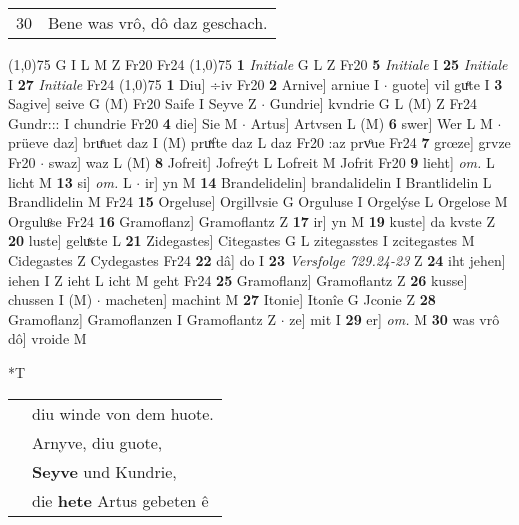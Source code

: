\documentclass[8pt,a4paper,notitlepage]{article}
\begin{document}
\begin{table}[ht]
\begin{minipage}[t]{0.5\linewidth}
\begin{tabular}{rl}
30 & Bene was vrô, dô daz geschach.\\ 
\end{tabular}
\scriptsize
\line(1,0){75} \newline
G I L M Z Fr20 Fr24 \newline
\line(1,0){75} \newline
\textbf{1} \textit{Initiale} G L Z Fr20  \textbf{5} \textit{Initiale} I  \textbf{25} \textit{Initiale} I  \textbf{27} \textit{Initiale} Fr24  \newline
\line(1,0){75} \newline
\textbf{1} Diu] ÷iv Fr20 \textbf{2} Arnive] arniue I  $\cdot$ guote] vil guͤte I \textbf{3} Sagive] seive G (M) Fr20 Saife I Seyve Z  $\cdot$ Gundrie] kvndrie G L (M) Z Fr24 Gundr::: I chundrie Fr20 \textbf{4} die] Sie M  $\cdot$ Artus] Artvsen L (M) \textbf{6} swer] Wer L M  $\cdot$ prüeve daz] bruͤuet daz I (M) pruͯfte daz L daz Fr20 :az prvͦue Fr24 \textbf{7} grœze] grvze Fr20  $\cdot$ swaz] waz L (M) \textbf{8} Jofreit] Jofreýt L Lofreit M Jofrit Fr20 \textbf{9} lieht] \textit{om.} L licht M \textbf{13} si] \textit{om.} L  $\cdot$ ir] yn M \textbf{14} Brandelidelin] brandalidelin I Brantlidelin L Brandlidelin M Fr24 \textbf{15} Orgeluse] Orgillvsie G Orguluse I Orgelýse L Orgelose M Orguluͦse Fr24 \textbf{16} Gramoflanz] Gramoflantz Z \textbf{17} ir] yn M \textbf{19} kuste] da kvste Z \textbf{20} luste] geluͯste L \textbf{21} Zidegastes] Citegastes G L zitegasstes I zcitegastes M Cidegastes Z Cydegastes Fr24 \textbf{22} dâ] do I \textbf{23} \textit{Versfolge 729.24-23} Z  \textbf{24} iht jehen] iehen I Z ieht L icht M geht Fr24 \textbf{25} Gramoflanz] Gramoflantz Z \textbf{26} kusse] chussen I (M)  $\cdot$ macheten] machint M \textbf{27} Itonie] Itonîe G Jconie Z \textbf{28} Gramoflanz] Gramoflanzen I Gramoflantz Z  $\cdot$ ze] mit I \textbf{29} er] \textit{om.} M \textbf{30} was vrô dô] vroide M \newline
\end{minipage}
\hspace{0.5cm}
\begin{minipage}[t]{0.5\linewidth}
\small
\begin{center}*T
\end{center}
\begin{tabular}{rl}
 & diu winde von dem huote.\\ 
 & Arnyve, diu guote,\\ 
 & \textbf{Seyve} und Kundrie,\\ 
 & die \textbf{hete} Artus gebeten ê\\ 

\end{tabular}
\end{minipage}
\end{table}
\end{document}
